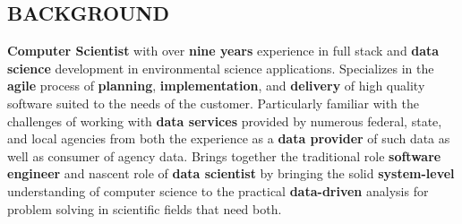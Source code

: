\documentclass[line,margin]{res}
\begin{document}
\address{104 14th Street, Prairie du Sac, WI 53578}
\address{email: jordan@jordanwalker.us | phone: 608.370.1908}
 
\begin{resume}
 
\section{BACKGROUND}
	\textbf{Computer Scientist} with over \textbf{nine years} experience in full stack and \textbf{data science} development in environmental science applications.
	Specializes in the \textbf{agile} process of \textbf{planning}, \textbf{implementation}, and \textbf{delivery} of high quality software suited to the needs of the customer.
	Particularly familiar with the challenges of working with \textbf{data services} provided by numerous federal, state, and local agencies from both the experience as a \textbf{data provider} of such data as well as consumer of agency data.
	Brings together the traditional role \textbf{software engineer} and nascent role of \textbf{data scientist} by bringing the solid \textbf{system-level} understanding of computer science to the practical \textbf{data-driven} analysis for problem solving in scientific fields that need both.



\end{resume}
\end{document}
